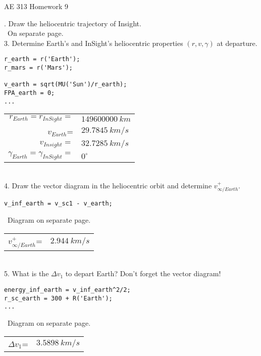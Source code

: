 \documentclass[hidelinks,12pt]{article}
\begin{document}

\begin{center}
\large AE 313 Homework 9
\end{center}
. Draw the heliocentric trajectory of Insight.\\
~On separate page.\\
\vspace{10px}
3. Determine Earth's and InSight's heliocentric properties $(r, v, \gamma)$ at departure.\\
\begin{lstlisting}[frame=lines,style=Matlab-editor,basicstyle = \mlttfamily]
r_earth = r('Earth');
r_mars = r('Mars');

v_earth = sqrt(MU('Sun')/r_earth);
FPA_earth = 0;
...
\end{lstlisting}
\begin{tabular}{rl}
$r_{Earth}=r_{InSight}=$&$149600000~km$\\
$v_{Earth}$=&$29.7845~km/s$\\
$v_{Insight}=$&$32.7285~km/s$\\
$\gamma_{Earth}=\gamma_{InSight}=$&$0^\circ$\\
\end{tabular}
\vspace{10px}\\
4. Draw the vector diagram in the heliocentric orbit and determine $v^+_{\infty/Earth}$.\\
\begin{lstlisting}[frame=lines,style=Matlab-editor,basicstyle = \mlttfamily]
v_inf_earth = v_sc1 - v_earth;
\end{lstlisting}
~Diagram on separate page.\\
\begin{tabular}{rl}
$v^+_{\infty/Earth}$=&$2.944~km/s$\\
\end{tabular}\\
\vspace{10px}
5. What is the $\Delta v_1$ to depart Earth? Don't forget the vector diagram!\\
\begin{lstlisting}[frame=lines,style=Matlab-editor,basicstyle = \mlttfamily]
energy_inf_earth = v_inf_earth^2/2;
r_sc_earth = 300 + R('Earth');
...
\end{lstlisting}
~Diagram on separate page.\\
\begin{tabular}{rl}
$\Delta v_1$=&$3.5898~km/s$\\
\end{tabular}\\
\end{document}
